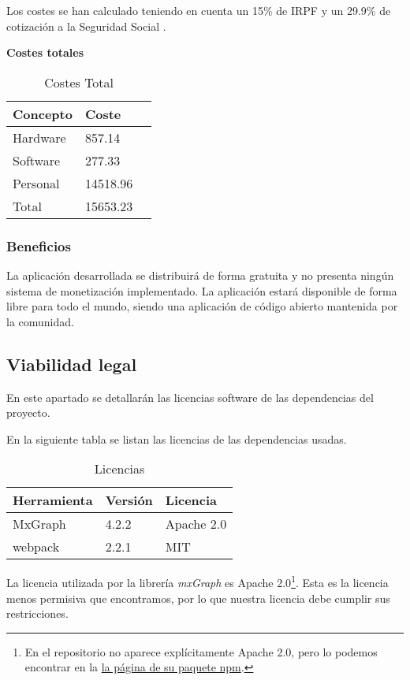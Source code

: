 Los costes se han calculado teniendo en cuenta un 15\% de IRPF \cite{ia:irpf} y un 29.9\% de cotización a la Seguridad Social \cite{ss:cotiz}.

\textbf{Costes totales}
\begin{table}[H]
    \centering
    \begin{tabular}{@{}lll@{}}\toprule
         \textbf{Concepto} & \textbf{Coste} \\ \midrule
         Hardware & 857.14 \\
         Software & 277.33\\
         Personal & 14518.96\\ \midrule
         Total & 15653.23\\ \bottomrule
    \end{tabular}
    \caption{Costes Total}
    \label{ve:cost-tot}
\end{table}

\subsubsection{Beneficios}

La aplicación desarrollada se distribuirá de forma gratuita y no presenta ningún sistema de monetización implementado. La aplicación estará disponible de forma libre para todo el mundo, siendo una aplicación de código abierto mantenida por la comunidad.

\subsection{Viabilidad legal}
En este apartado se detallarán las licencias software de las dependencias del proyecto.

En la siguiente tabla se listan las licencias de las dependencias usadas.
\begin{table}[H]
    \centering
    \begin{tabular}{@{}lll@{}}\toprule
        \textbf{Herramienta} & \textbf{Versión} & \textbf{Licencia}\\ \midrule
        MxGraph & 4.2.2 & Apache 2.0 \\
        webpack & 2.2.1 & MIT \\ \bottomrule
    \end{tabular}
    \caption{Licencias}
    \label{tab:my_label}
\end{table}

La licencia utilizada por la librería \textit{mxGraph} es Apache 2.0\footnote{En el repositorio no aparece explícitamente Apache 2.0, pero lo podemos encontrar en la \href{https://www.npmjs.com/package/mxgraph}{la página de su paquete npm}.}. Esta es la licencia menos permisiva que encontramos, por lo que nuestra licencia debe cumplir sus restricciones.

